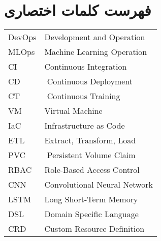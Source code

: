 \chapter*{فهرست کلمات اختصاری}  



\begin{latin}
{
\setlength{\baselineskip}{0.5\baselineskip}
\hfil
\begin{tabular}{p{3cm}l}
DevOps & Development and Operation \\
MLOps  & Machine Learning Operation \\
CI     & Continuous Integration \\
CD     &‌ Continuous Deployment \\
CT     &‌ Continuous Training \\
VM     & Virtual Machine \\
IaC    & Infrastructure as Code \\
ETL‌    & Extract, Transform, Load \\
PVC    &‌ Persistent Volume Claim \\
RBAC   & Role-Based Access Control \\
CNN    & Convolutional  Neural Network \\
LSTM‌   & Long Short-Term Memory \\
DSL‌& Domain Specific Language \\
CRD‌& Custom Resource Definition


\end{tabular}
}
\end{latin}
